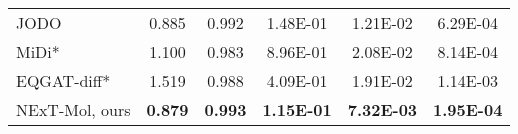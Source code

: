 \begin{tabular}{lccccccccc}
JODO                           & 0.885                        & \multicolumn{2}{c}{0.992}                                                         & \multicolumn{2}{c}{1.48E-01}                                         & \multicolumn{2}{c}{1.21E-02}                                & \multicolumn{2}{c}{6.29E-04}                                \\
MiDi*                          & 1.100                        & \multicolumn{2}{c}{0.983}                                                         & \multicolumn{2}{c}{8.96E-01}                                         & \multicolumn{2}{c}{2.08E-02}                                & \multicolumn{2}{c}{8.14E-04}                                \\
EQGAT-diff*                          & 1.519                        & \multicolumn{2}{c}{0.988}                                                         & \multicolumn{2}{c}{4.09E-01}                                         & \multicolumn{2}{c}{1.91E-02}                                & \multicolumn{2}{c}{1.14E-03}                                \\
NExT-Mol, ours                 & \textbf{0.879}               & \multicolumn{2}{c}{\textbf{0.993}}                                       & \multicolumn{2}{c}{\textbf{1.15E-01}}                                & \multicolumn{2}{c}{\textbf{7.32E-03}}                       & \multicolumn{2}{c}{\textbf{1.95E-04}}                      \\ \bottomrule
\end{tabular}


